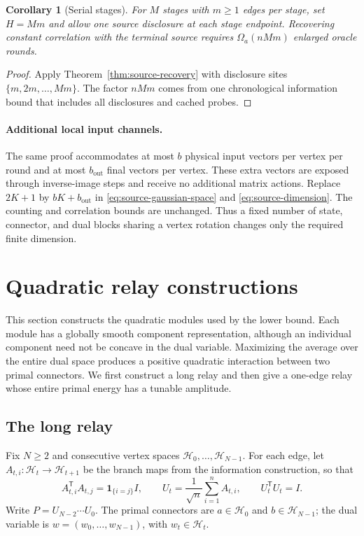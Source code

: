 \documentclass[11pt,letterpaper]{article}
\newtheorem{corollary}[theorem]{Corollary}
\theoremstyle{definition}
\theoremstyle{remark}
\begin{document}
\begin{corollary}[Serial stages]
\label{cor:source-stages}
For $M$ stages with $m\geq1$ edges per stage, set $H=Mm$ and
allow one source disclosure at each stage endpoint.  Recovering
constant correlation with the terminal source requires
$\Omega_a(nMm)$ enlarged oracle rounds.
\end{corollary}

\begin{proof}
Apply Theorem~\ref{thm:source-recovery} with disclosure sites
$\{m,2m,\ldots,Mm\}$.  The factor $nMm$ comes from one
chronological information bound that includes all disclosures and
cached probes.
\end{proof}

\paragraph{Additional local input channels.}
The same proof accommodates at most $b$ physical input vectors per
vertex per round and at most $b_{\mathrm{out}}$ final vectors per
vertex.  These extra vectors are exposed through inverse-image
steps and receive no additional matrix actions.  Replace $2K+1$
by $bK+b_{\mathrm{out}}$ in
\eqref{eq:source-gaussian-space} and
\eqref{eq:source-dimension}.  The counting and correlation bounds
are unchanged.  Thus a fixed number of state, connector, and dual
blocks sharing a vertex rotation changes only the required finite
dimension.

\section{Quadratic relay constructions}
\label{sec:relays}

This section constructs the quadratic modules used by the lower bound.
Each module has a globally smooth component representation, although an
individual component need not be concave in the dual variable.  Maximizing
the average over the entire dual space produces a positive quadratic
interaction between two primal connectors.  We first construct a long
relay and then give a one-edge relay whose entire primal energy has a
tunable amplitude.

\subsection{The long relay}
\label{sec:long-relay}

Fix $N\ge 2$ and consecutive vertex spaces
$\mathcal H_0,\ldots,\mathcal H_{N-1}$.  For each edge, let
$A_{t,i}:\mathcal H_t\to\mathcal H_{t+1}$ be the branch maps from the
information construction, so that
\[
 A_{t,i}^{\mathsf T}A_{t,j}=\mathbf 1_{\{i=j\}}I,
 \qquad
 U_t=\frac1{\sqrt n}\sum_{i=1}^n A_{t,i},
 \qquad U_t^{\mathsf T}U_t=I.
\]
Write $P=U_{N-2}\cdots U_0$.  The primal connectors are
$a\in\mathcal H_0$ and $b\in\mathcal H_{N-1}$; the dual variable is
$w=(w_0,\ldots,w_{N-1})$, with $w_t\in\mathcal H_t$.
\end{document}
